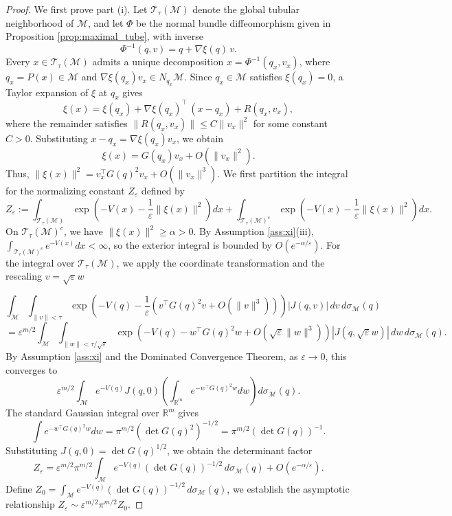 \documentclass[12pt]{article}
\begin{document}
\begin{proof}
We first prove part (i). Let $\mathcal{T}_\tau(\mathcal{M})$ denote the global tubular neighborhood of $\mathcal{M}$, and let $\Phi$ be the normal bundle diffeomorphism given in Proposition \ref{prop:maximal_tube}, with inverse
\[
\Phi^{-1}(q,v) = q + \nabla \xi(q)\, v.
\]
Every $x \in \mathcal{T}_\tau(\mathcal{M})$ admits a unique decomposition $x = \Phi^{-1}(q_x,v_x)$, where $q_x = P(x) \in \mathcal{M}$ and $\nabla \xi (q_x)v_x \in N_{q_x}\mathcal{M}$.
Since $q_x \in \mathcal{M}$ satisfies $\xi(q_x)=0$, a Taylor expansion of $\xi$ at $q_x$ gives
\[
\xi(x)
=
\xi(q_x) + 
\nabla\xi(q_x)^\top\,(x-q_x)
+
R(q_x,v_x),
\]
where the remainder satisfies $\|R(q_x,v_x)\| \le C \|v_x\|^2$ for some constant $C>0$. Substituting $x-q_x = \nabla \xi(q_x)v_x$, we obtain
\[
\xi(x) = G(q_x) v_x + O(\|v_x\|^2).
\]
Thus, $\|\xi(x)\|^2 = v_x^\top G(q)^2 v_x + O(\|v_x\|^3)$. We first partition the integral for the normalizing constant $Z_\varepsilon$ defined by 
$$Z_\varepsilon := \int_{\mathcal{T}_\tau(\mathcal{M})} \exp\left(-V(x) - \frac{1}{\varepsilon}\|\xi(x)\|^2\right) dx + \int_{\mathcal{T}_\tau(\mathcal{M})^c} \exp\left(-V(x) - \frac{1}{\varepsilon}\|\xi(x)\|^2\right) dx.$$
On $\mathcal{T}_\tau(\mathcal{M})^c$, we have $\|\xi(x)\|^2 \ge \alpha > 0$. By Assumption \ref{ass:xi}(iii), $\int_{\mathcal{T}_\tau(\mathcal{M})^c} e^{-V(x)}dx < \infty$, so the exterior integral is bounded by $O(e^{-\alpha/\varepsilon})$. For the integral over $\mathcal{T}_\tau(\mathcal{M})$, we apply the coordinate transformation and the rescaling $v = \sqrt{\varepsilon}w$

$$\int_{\mathcal{M}} \int_{\|v\| < \tau} \exp\left(-V(q) - \frac{1}{\varepsilon}\left(v^\top G(q)^2 v + O(\|v\|^3)\right)\right) |J(q,v)| \, dv \, d\sigma_{\mathcal{M}}(q)$$
$$= \varepsilon^{m/2} \int_{\mathcal{M}} \int_{\|w\| < \tau/\sqrt{\varepsilon}} \exp\left(-V(q) - w^\top G(q)^2 w + O(\sqrt{\varepsilon}\|w\|^3)\right) |J(q,\sqrt{\varepsilon}w)| \, dw \, d\sigma_{\mathcal{M}}(q).$$
By Assumption \ref{ass:xi} and the Dominated Convergence Theorem, as $\varepsilon \to 0$, this converges to
$$\varepsilon^{m/2} \int_{\mathcal{M}} e^{-V(q)} J(q,0) \left( \int_{\mathbb{R}^m} e^{-w^\top G(q)^2 w} dw \right) d\sigma_{\mathcal{M}}(q).$$
The standard Gaussian integral over $\mathbb{R}^m$ gives $$\int e^{-w^\top G(q)^2 w} dw = \pi^{m/2} (\det G(q)^2)^{-1/2} = \pi^{m/2} (\det G(q))^{-1}.$$ 
Substituting $J(q,0) = \det G(q)^{1/2}$, we obtain the determinant factor
$$Z_\varepsilon = \varepsilon^{m/2} \pi^{m/2} \int_{\mathcal{M}} e^{-V(q)} (\det G(q))^{-1/2} \, d\sigma_{\mathcal{M}}(q) + O(e^{-\alpha/\varepsilon}).$$
Define $Z_0 = \int_{\mathcal{M}} e^{-V(q)} (\det G(q))^{-1/2} \, d\sigma_{\mathcal{M}}(q)$, we establish the asymptotic relationship $Z_\varepsilon \sim \varepsilon^{m/2} \pi^{m/2} Z_0$.


\end{proof}
\end{document}
